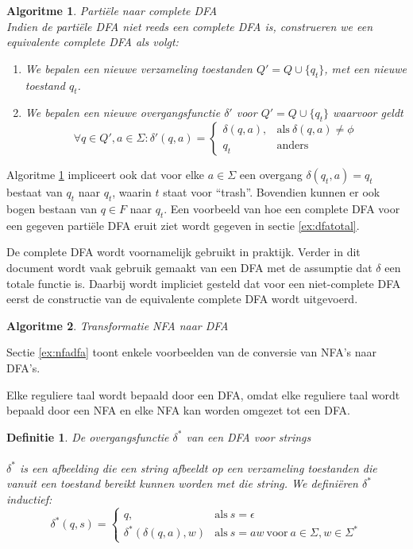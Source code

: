\documentclass[a4paper]{article}
\newtheorem{tdefinitie}{Definitie}[section]
\newenvironment{definitie}[1]%
  {\begin{mdframed}[backgroundcolor=silver,
    topline=false,
    rightline=false,
    leftline=false,
    bottomline=false]\begin{tdefinitie}#1\\\normalfont}%
  {\end{tdefinitie}\end{mdframed}}
\newtheorem{talgo}{Algoritme}[section]
\newenvironment{algoritme}[1]%
  {\begin{mdframed}[backgroundcolor=silver,
    topline=false,
    rightline=false,
    leftline=false,
    bottomline=false]\begin{talgo}#1\\\normalfont}%
  {\end{talgo}\end{mdframed}}
\newenvironment{enumalgo}%
  {\begin{enumerate}[leftmargin=1.5cm,label=Stap \arabic*:]}%
  {\end{enumerate}}
\newcommand{\powerset}{\ensuremath{\mathcal{P}}}
\newcommand{\sstar}{\ensuremath{\Sigma^*}}
\begin{document}
\begin{algoritme}{Parti\"ele naar complete DFA}
  \label{alg:cdfa}
  Indien de parti\"ele DFA niet reeds een complete DFA is, construeren we een equivalente complete DFA als volgt:
  \begin{enumalgo}
  \item We bepalen een nieuwe verzameling toestanden $Q' = Q \cup \{q_t\}$, met een nieuwe toestand $q_t$.
  \item We bepalen een nieuwe overgangsfunctie $\delta'$ voor $Q' = Q \cup \{q_t\}$ waarvoor geldt
  \begin{equation*}
  \forall q \in Q', a \in \Sigma: \delta'(q, a) = \begin{cases}
    \delta(q, a), & \text{als}\ \delta(q, a) \neq \phi\\
    q_t & \text{anders}
  \end{cases}
  \end{equation*}
  \end{enumalgo}
\end{algoritme}

Algoritme \ref{alg:cdfa} impliceert ook dat voor elke $a \in \Sigma$ een overgang $\delta(q_t,a)=q_t$ bestaat van $q_t$ naar $q_t$, waarin $t$ staat voor ``trash''. Bovendien kunnen er ook bogen bestaan van $q \in F$ naar $q_t$. Een voorbeeld van hoe een complete DFA voor een gegeven parti\"ele DFA eruit ziet wordt gegeven in sectie \ref{ex:dfatotal}.

De complete DFA wordt voornamelijk gebruikt in praktijk. Verder in dit document wordt vaak gebruik gemaakt van een DFA met de assumptie dat $\delta$ een totale functie is. Daarbij wordt impliciet gesteld dat voor een niet-complete DFA eerst de constructie van de equivalente complete DFA wordt uitgevoerd.

\begin{algoritme}{Transformatie NFA naar DFA}
  \label{alg:nfadfa} 
\end{algoritme}

Sectie \ref{ex:nfadfa} toont enkele voorbeelden van de conversie van NFA's naar DFA's.

Elke reguliere taal wordt bepaald door een DFA, omdat elke reguliere taal wordt bepaald door een NFA en elke NFA kan worden omgezet tot een DFA.

\begin{definitie}{De overgangsfunctie $\delta^*$ van een DFA voor strings}
  \label{def:deltaster}
  \bm{$\delta^*: (\powerset(Q) \times \sstar) \rightarrow \powerset(Q)$}\\
  $\delta^*$ is een afbeelding die een string afbeeldt op een verzameling toestanden die vanuit een toestand bereikt kunnen worden met die string. We defini\"eren $\delta^*$ inductief:
  \begin{equation*}
    \delta^*(q, s) = \begin{cases}
      q, & \text{als}\ s=\epsilon \\
      \delta^*(\delta(q, a), w) & \text{als}\ s=aw\ \text{voor}\ a \in \Sigma, w \in \sstar
    \end{cases}
  \end{equation*}
\end{definitie}
\end{document}
